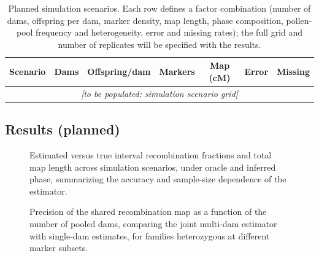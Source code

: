 \documentclass[11pt]{article}
\begin{document}
\begin{table}[t]
\centering
\caption{Planned simulation scenarios. Each row defines a factor combination
(number of dams, offspring per dam, marker density, map length, phase composition,
pollen-pool frequency and heterogeneity, error and missing rates); the full grid and
number of replicates will be specified with the results.}
\label{tab:sim_scenarios}
\begin{tabular}{lcccccc}
\toprule
Scenario & Dams & Offspring/dam & Markers & Map (cM) & Error & Missing \\
\midrule
\multicolumn{7}{c}{\emph{[to be populated: simulation scenario grid]}} \\
\bottomrule
\end{tabular}
\end{table}

\subsection{Results (planned)}

\begin{figure}[t]
\centering
{}
\caption{Estimated versus true interval recombination fractions and total map length
across simulation scenarios, under oracle and inferred phase, summarizing the accuracy
and sample-size dependence of the estimator.}
\label{fig:sim_accuracy}
\end{figure}

\begin{figure}[t]
\centering
{}
\caption{Precision of the shared recombination map as a function of the number of
pooled dams, comparing the joint multi-dam estimator with single-dam estimates, for
families heterozygous at different marker subsets.}
\label{fig:multidam}
\end{figure}
\end{document}
